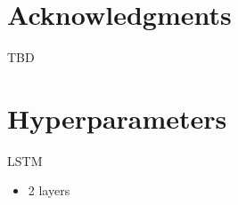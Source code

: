 \documentclass[11pt,a4paper]{article}
\begin{document}
\section*{Acknowledgments}
TBD




\appendix

\section{Hyperparameters}
\label{sec:hyperparams}
LSTM
\begin{itemize}
\item 2 layers
\end{itemize}

\begin{comment}
\section{Parameter estimation}
We maximize the evidence of the observed sentences
$\log p(\bx) = \log \sum_{\bz} p(\bx, \bz)$
via gradient ascent.

\subsection{Gradient of the evidence}
Let $\psi_0(z_0, z_1) = \log p(x_0, z_0)$ and
$\psi_t(z_{t}, z_{t+1}) = \log p(x_{t+1}, z_{t+1} \mid z_{t})$ for $t \in \set{1, \ldots, T-1}$.
Additionally, let $\oplus$ and $\otimes$ be addition and multiplication in the log semiring.
After conditioning on the observed $\bx$, we can express the evidence as the following:
\begin{equation}
\label{eqn:evidence}
A_x = \log p(\bx) = \bigoplus_{\bz}\bigotimes_{t=0}^{T-1} \psi_t(z_t, z_{t+1})
\end{equation}
where $A_\bx$ is the clamped log partition function (after observing $\bx_{0:T}$).

We show that the gradient of the log partition function with respect to the $\psi_t(z_t, z_{t+1})$
is the first moment (a general result for the cumulant generating function
of exponential family distributions). Given the value of the derivative
$\frac{\partial A_\bx}{\partial \psi_t(z_t, z_{t+1})}$,
we can then apply the chain rule to compute the total derivative with respect to
downstream parameters. For example, the gradient with respect to the transition matrix
of the HMM is given by
$$\frac{\partial A_\bx}{\partial \theta_{ij}}
= \sum_t \frac{\partial A_\bx}{\partial \psi_t(i,j)}
\frac{\partial \psi_t(i,j)}{\partial \theta_{ij}}$$


\end{comment}
\end{document}
